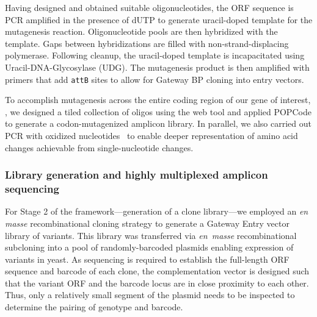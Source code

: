 Having designed and obtained suitable oligonucleotides, the ORF sequence is PCR amplified in the presence of dUTP to generate uracil-doped template for the mutagenesis reaction. Oligonucleotide pools are then hybridized with the template. Gaps between hybridizations are filled with non-strand-displacing polymerase. 
Following cleanup, the uracil-doped template is incapacitated using Uracil-DNA-Glycosylase (UDG). The mutagenesis product is then amplified with primers that add \texttt{attB} sites to allow for Gateway BP cloning into entry vectors.

To accomplish mutagenesis across the entire coding region of our gene of interest, , we designed a tiled collection of oligos using the web tool and applied POPCode to generate a codon-mutagenized amplicon library.  In parallel, we also carried out PCR with oxidized nucleotides~\cite{mohan_pcr_2011} to enable deeper representation of amino acid changes achievable from single-nucleotide changes.

\subsubsection{Library generation and highly multiplexed amplicon sequencing}

For Stage 2 of the framework---generation of a clone library---we employed an \textit{en masse} recombinational cloning strategy to generate a Gateway Entry vector library of  variants. This library was transferred via \textit{en~masse} recombinational subcloning into a pool of randomly-barcoded plasmids enabling expression of  variants in yeast. As sequencing is required to establish the full-length ORF sequence and barcode of each clone, the complementation vector is designed such that the variant ORF and the barcode locus are in close proximity to each other. Thus, only a relatively small segment of the plasmid needs to be inspected to determine the pairing of genotype and barcode. 

